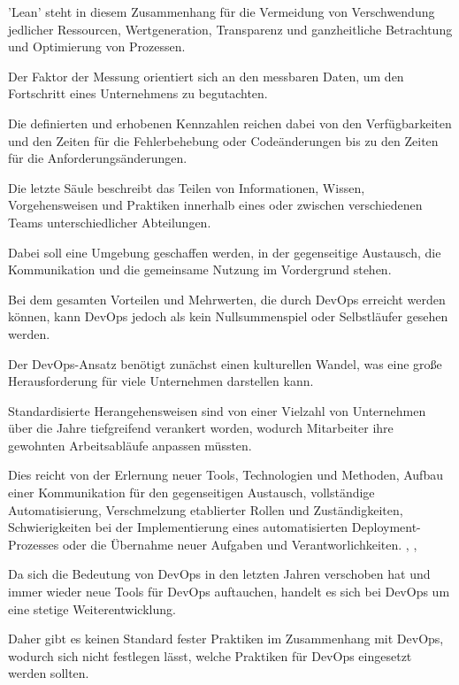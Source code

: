 'Lean' steht in diesem Zusammenhang für die Vermeidung von Verschwendung jedlicher Ressourcen, Wertgeneration, Transparenz und ganzheitliche Betrachtung und Optimierung von Prozessen.

Der Faktor der Messung orientiert sich an den messbaren Daten, um den Fortschritt eines Unternehmens zu begutachten. 

Die definierten und erhobenen Kennzahlen reichen dabei von den Verfügbarkeiten und den Zeiten für die Fehlerbehebung oder Codeänderungen bis zu den Zeiten für die Anforderungsänderungen. \cite[S. 7]{halstenberg_devops_2020}  

Die letzte Säule beschreibt das Teilen von Informationen, Wissen, Vorgehensweisen und Praktiken innerhalb eines oder zwischen verschiedenen Teams unterschiedlicher Abteilungen. \cite{halstenberg_devops_2020} 

Dabei soll eine Umgebung geschaffen werden, in der gegenseitige Austausch, die Kommunikation und die gemeinsame Nutzung im Vordergrund stehen.

Bei dem gesamten Vorteilen und Mehrwerten, die durch DevOps erreicht werden können, kann DevOps jedoch als kein Nullsummenspiel oder Selbstläufer gesehen werden. \cite{humble_why_2011} 

Der DevOps-Ansatz benötigt zunächst einen kulturellen Wandel, was eine große Herausforderung für viele Unternehmen darstellen kann. 

Standardisierte Herangehensweisen sind von einer Vielzahl von Unternehmen über die Jahre tiefgreifend verankert worden, wodurch Mitarbeiter ihre gewohnten Arbeitsabläufe anpassen müssten. 
 
Dies reicht von der Erlernung neuer Tools, Technologien und Methoden, Aufbau einer Kommunikation für den gegenseitigen Austausch, vollständige Automatisierung, Verschmelzung etablierter Rollen und Zuständigkeiten, Schwierigkeiten bei der Implementierung eines automatisierten Deployment-Prozesses oder die Übernahme neuer Aufgaben und Verantworlichkeiten. \cite{lwakatare_devops_2019}, \cite[S. 594 - 595]{abrahamsson_product-focused_2016}, \cite[S. 43 - 45]{halstenberg_devops_2020}

Da sich die Bedeutung von DevOps in den letzten Jahren verschoben hat und immer wieder neue Tools für DevOps auftauchen, handelt es sich bei DevOps um eine stetige Weiterentwicklung. \cite[S. 595]{abrahamsson_product-focused_2016} 

Daher gibt es keinen Standard fester Praktiken im Zusammenhang mit DevOps, wodurch sich nicht festlegen lässt, welche Praktiken für DevOps eingesetzt werden sollten. 

